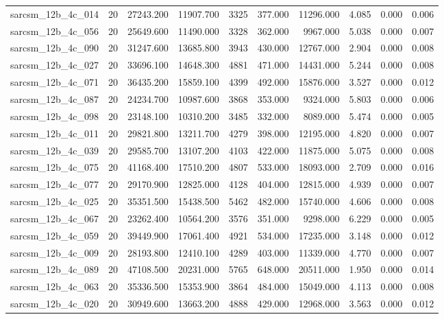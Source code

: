 \begin{tabular}{lrrrrrrrrr}
sarcsm\_12b\_4c\_014 & 20 & 27243.200 & 11907.700 & 3325 & 377.000 & 11296.000 & 4.085 & 0.000 & 0.006 \\
sarcsm\_12b\_4c\_056 & 20 & 25649.600 & 11490.000 & 3328 & 362.000 & 9967.000 & 5.038 & 0.000 & 0.007 \\
sarcsm\_12b\_4c\_090 & 20 & 31247.600 & 13685.800 & 3943 & 430.000 & 12767.000 & 2.904 & 0.000 & 0.008 \\
sarcsm\_12b\_4c\_027 & 20 & 33696.100 & 14648.300 & 4881 & 471.000 & 14431.000 & 5.244 & 0.000 & 0.008 \\
sarcsm\_12b\_4c\_071 & 20 & 36435.200 & 15859.100 & 4399 & 492.000 & 15876.000 & 3.527 & 0.000 & 0.012 \\
sarcsm\_12b\_4c\_087 & 20 & 24234.700 & 10987.600 & 3868 & 353.000 & 9324.000 & 5.803 & 0.000 & 0.006 \\
sarcsm\_12b\_4c\_098 & 20 & 23148.100 & 10310.200 & 3485 & 332.000 & 8089.000 & 5.474 & 0.000 & 0.005 \\
sarcsm\_12b\_4c\_011 & 20 & 29821.800 & 13211.700 & 4279 & 398.000 & 12195.000 & 4.820 & 0.000 & 0.007 \\
sarcsm\_12b\_4c\_039 & 20 & 29585.700 & 13107.200 & 4103 & 422.000 & 11875.000 & 5.075 & 0.000 & 0.008 \\
sarcsm\_12b\_4c\_075 & 20 & 41168.400 & 17510.200 & 4807 & 533.000 & 18093.000 & 2.709 & 0.000 & 0.016 \\
sarcsm\_12b\_4c\_077 & 20 & 29170.900 & 12825.000 & 4128 & 404.000 & 12815.000 & 4.939 & 0.000 & 0.007 \\
sarcsm\_12b\_4c\_025 & 20 & 35351.500 & 15438.500 & 5462 & 482.000 & 15740.000 & 4.606 & 0.000 & 0.008 \\
sarcsm\_12b\_4c\_067 & 20 & 23262.400 & 10564.200 & 3576 & 351.000 & 9298.000 & 6.229 & 0.000 & 0.005 \\
sarcsm\_12b\_4c\_059 & 20 & 39449.900 & 17061.400 & 4921 & 534.000 & 17235.000 & 3.148 & 0.000 & 0.012 \\
sarcsm\_12b\_4c\_009 & 20 & 28193.800 & 12410.100 & 4289 & 403.000 & 11339.000 & 4.770 & 0.000 & 0.007 \\
sarcsm\_12b\_4c\_089 & 20 & 47108.500 & 20231.000 & 5765 & 648.000 & 20511.000 & 1.950 & 0.000 & 0.014 \\
sarcsm\_12b\_4c\_063 & 20 & 35336.500 & 15353.900 & 3864 & 484.000 & 15049.000 & 4.113 & 0.000 & 0.008 \\
sarcsm\_12b\_4c\_020 & 20 & 30949.600 & 13663.200 & 4888 & 429.000 & 12968.000 & 3.563 & 0.000 & 0.012 \\

\end{tabular}
